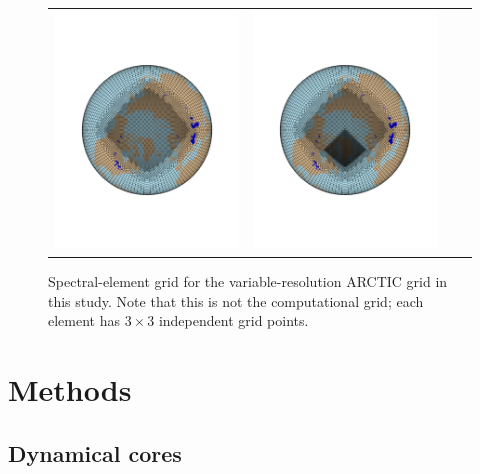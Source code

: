 \documentclass[draft]{agujournal2019}
\begin{document}
\begin{figure}[t]
\begin{center}
\begin{tabular}{cccc}
         \includegraphics[width=60mm]{figs/grid-ARCTIC.pdf}&
         \includegraphics[width=60mm]{figs/grid-ARCTICGRIS.pdf} \\
\end{tabular}
\end{center}
\caption{Spectral-element grid for the variable-resolution ARCTIC grid in this study. Note that this is not the computational grid; each element has $3\times3$ independent grid points.}
\label{fig:vr-grids}
\end{figure}

\section{Methods}\label{sec:methods}
\subsection{Dynamical cores}
\end{document}
